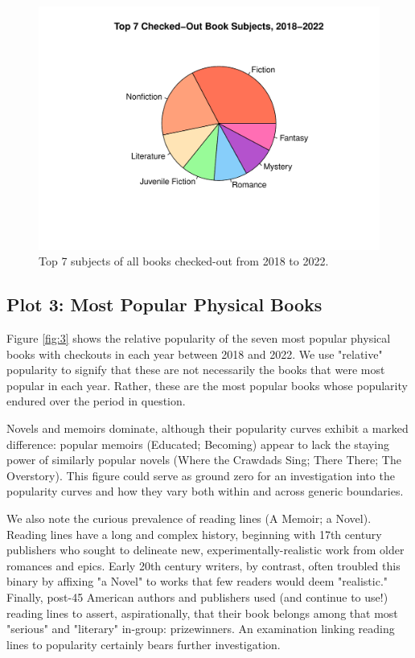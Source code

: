 \documentclass[10pt]{article}\usepackage[]{graphicx}\usepackage[]{xcolor}
\makeatletter
\def\maxwidth{ %
  \ifdim\Gin@nat@width>\linewidth
    \linewidth
  \else
    \Gin@nat@width
  \fi
}
\newenvironment{knitrout}{}{} %
\makeatother
\begin{document}
\begin{figure}[H]
\begin{center}
\begin{knitrout}
\color{fgcolor}
\includegraphics[width=\maxwidth]{figure/plot2-1} 
\end{knitrout}
\end{center}
\caption{Top 7 subjects of all books checked-out from 2018 to 2022.}\label{fig:2}
\end{figure}

\subsection{Plot 3: Most Popular Physical Books}

Figure \ref{fig:3} shows the relative popularity of the seven most popular physical books with checkouts in each year between 2018 and 2022. We use "relative" popularity to signify that these are not necessarily the books that were most popular in each year. Rather, these are the most popular books whose popularity endured over the period in question.

Novels and memoirs dominate, although their popularity curves exhibit a marked difference: popular memoirs (Educated; Becoming) appear to lack the staying power of similarly popular novels (Where the Crawdads Sing; There There; The Overstory). This figure could serve as ground zero for an investigation into the popularity curves and how they vary both within and across generic boundaries.

We also note the curious prevalence of reading lines (A Memoir; a Novel). Reading lines have a long and complex history, beginning with 17th century publishers who sought to delineate new, experimentally-realistic work from older romances and epics. Early 20th century writers, by contrast, often troubled this binary by affixing "a Novel" to works that few readers would deem "realistic." Finally, post-45 American authors and publishers used (and continue to use!) reading lines to assert, aspirationally, that their book belongs among that most "serious" and "literary" in-group: prizewinners. An examination linking reading lines to popularity certainly bears further investigation. 
\end{document}
